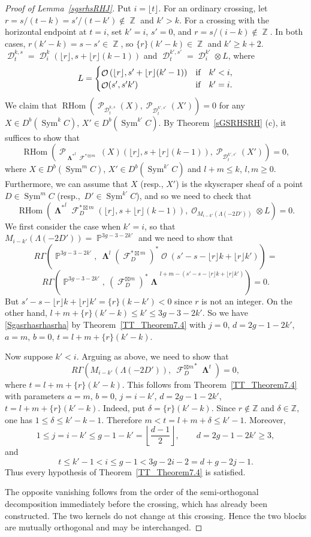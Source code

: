\documentclass[11pt,letterpaper]{amsart}
\theoremstyle{plain}
\theoremstyle{definition}
\theoremstyle{remark}
\numberwithin{equation}{section}
\DeclareMathOperator{\RHom}{RHom}
\DeclareMathOperator{\Sym}{Sym}
\DeclareMathOperator{\cD}{\mathcal{D}}
\DeclareMathOperator{\cF}{\mathcal{F}}
\DeclareMathOperator{\cO}{\mathcal{O}}
\DeclareMathOperator{\cP}{\mathcal{P}}
\DeclareMathOperator{\bP}{{\mathbb{P}}}
\DeclareMathOperator{\bZ}{{\mathbb{Z}}}
\DeclareMathOperator{\bLambda}{{\boldsymbol\Lambda}}
\newcommand{\ft}{{\lfloor t\rfloor}}
\newcommand{\fr}{{\lfloor r\rfloor}}
\begin{document}
\begin{proof}[Proof of Lemma~\ref{sgsrhsRHJ}]
Put $i=\ft$. For an ordinary crossing, let
$r=s/(t-k)=s'/(t-k')\notin\bZ$ and $k'>k$.
For a crossing with the horizontal endpoint at $t=i$, set
$k'=i$, $s'=0$, and $r=s/(i-k)\notin\bZ$.
In both cases, $r(k'-k)=s-s'\in\bZ$, so
$\{r\}(k'-k)\in\bZ$ and $k'\ge k+2$.
$\cD^{k,s}_t=
\cD^k_i\left(\fr, s+\fr(k-1)\right)$ 
and
$\cD^{k',s'}_t=\cD^{k'}_{i}\otimes L$,
where 
$$L=\begin{cases}
\cO\left(
\fr, s'+\fr(k'-1)\right)&\hbox{\rm if}\quad k'<i,\cr
\cO(s',s'k') &\hbox{\rm if}\quad k'=i.\cr
\end{cases}
$$
We claim that $\RHom(\cP_{\cD^{k,s}_t}(X),\cP_{\cD^{k',s'}_t}(X'))=0$ for any $X\in D^b(\Sym^kC)$, $X'\in D^b(\Sym^{k'}C)$.
By Theorem~\ref{sGSRHSRH} (c), it suffices to show that 
$$\RHom(\cP_{{\bLambda^*}^l{\cF^{*\boxtimes m}}}(X)\left(\fr, s+\fr(k-1)\right),\cP_{\cD^{k',s'}_t}(X'))=0,$$
where $X\in D^b(\Sym^mC)$, $X'\in D^b(\Sym^{k'}C)$
and  $l+m\le k$, $l,m\ge0$.
Furthermore, we can assume that $X$ (resp., $X'$)
is the skyscraper sheaf of a point $D\in \Sym^mC$ (resp.,~$D'\in\Sym^{k'}C$), and so we need to check that 
$$\RHom({\bLambda^*}^l{\cF_D^{*\boxtimes m}}\left(\fr, s+\fr(k-1)\right),\cO_{M_{i-k'}(\Lambda(-2D'))}\otimes L)=0.$$
We first consider the case when $\boxed{k'=i}$, so that $M_{i-k'}(\Lambda(-2D'))=\bP^{3g-3-2k'}$ and we need to show that 
\begin{equation}\label{Sgasrhasrhasrha}
R\Gamma(\bP^{3g-3-2k'},\ 
{\bLambda}^l({\cF_D^{*\boxtimes m}})^*\cO(s'-s-\fr k+\fr k'))=
\end{equation}
$$R\Gamma(\bP^{3g-3-2k'},\ 
{({\cF_D^{\boxtimes m}})^*\bLambda}^{l+m-(s'-s-\fr k+\fr k')})=0.$$
But $s'-s-\fr k+\fr k'=\{r\}(k-k')<0$ since $r$ is not an integer.
On the other hand, $l+m+\{r\}(k'-k)\le k'\le 3g-3-2k'$. So we have \eqref{Sgasrhasrhasrha}
by Theorem~\ref{TT_Theorem7.4} with $j=0$, $d=2g-1-2k'$, $a=m$, $b=0$, $t=l+m+\{r\}(k'-k)$.

Now suppose $\boxed{k'<i}$. Arguing as above, we need to show that
$$R\Gamma(M_{i-k'}(\Lambda(-2D')),\ 
{\cF_D^{\boxtimes m}}^*{\bLambda}^{t})=0,$$
where $t=l+m+\{r\}(k'-k)$. 
This  follows from Theorem~\ref{TT_Theorem7.4} with parameters
$a=m$, $b=0$, $j=i-k'$, $d=2g-1-2k'$, $t=l+m+\{r\}(k'-k)$.
Indeed, put $\delta=\{r\}(k'-k)$.  Since $r\notin\mathbb Z$ and
$\delta\in\mathbb Z$, one has $1\le\delta\le k'-k-1$.  Therefore
$
m<t=l+m+\delta\le k'-1$.
Moreover,
\[
1\le j=i-k'\le g-1-k'
 =\left\lfloor\frac{d-1}{2}\right\rfloor,
\qquad d=2g-1-2k'\ge3,
\]
and
\[
t\le k'-1<i\le g-1<3g-2i-2=d+g-2j-1.
\]
Thus every hypothesis of Theorem~\ref{TT_Theorem7.4} is satisfied.

The opposite vanishing follows from the order of the semi-orthogonal decomposition immediately before the crossing, which has already been constructed. The two kernels do not change at this crossing. Hence the two blocks are mutually orthogonal and may be interchanged.
\end{proof}
\end{document}
